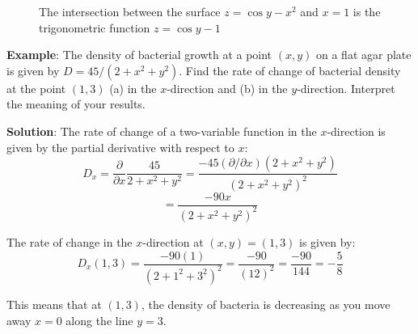 \begin{figure}[H]
    \centering
    \caption{The intersection between the surface $z = \cos{y} - x^2$ and 
    $x = 1$ is the trigonometric function $z = \cos{y} - 1$}
    \label{fig:ytangent}
\end{figure}

\textbf{Example}: The density of bacterial growth at a point $(x, y)$ on a 
flat agar plate is given by $D = 45/\left(2 + x^2 + y^2 \right)$. Find the 
rate of change of bacterial density at the point $(1, 3)$ (a) in the 
$x$-direction and (b) in the $y$-direction. Interpret the meaning of your 
results. 

\textbf{Solution}: The rate of change of a two-variable function in the 
$x$-direction is given by the partial derivative with respect to $x$:
$$D_x = \frac{\partial}{\partial x} \frac{45}{2 + x^2 + y^2} = \frac{-45 
\left( \partial/\partial x \right) \left(2 + x^2 + y^2 \right)}{\left(2 + 
x^2 + y^2 \right)^2}$$
$$= \frac{-90x}{\left( 2 + x^2 + y^2 \right)^2}$$

The rate of change in the $x$-direction at $(x, y) = (1, 3)$ is given by:
$$D_x(1, 3) = \frac{-90(1)}{\left( 2 + 1^2 + 3^2 \right)^2} = \frac{-90}{\left(
12 \right)^2} = \frac{-90}{144} = -\frac{5}{8}$$

This means that at $(1, 3)$, the density of bacteria is decreasing as you move 
away $x = 0$ along the line $y = 3$.


